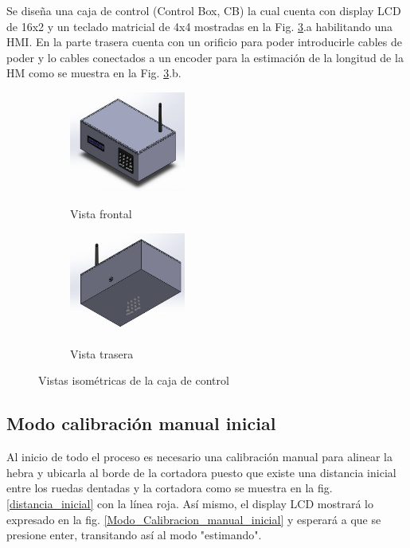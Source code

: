 \documentclass[main_conf.tex]{subfiles}
\begin{document}
Se diseña una caja de control (Control Box, CB) la cual cuenta
con display LCD de 16x2 y un teclado matricial de 4x4 mostradas
en la Fig. \ref{box_iso}.a habilitando una HMI. En la parte trasera
cuenta con un orificio para poder introducirle cables de poder y
lo cables conectados a un encoder para la estimación de la longitud
de la HM como se muestra en la Fig. \ref{box_iso}.b.

\begin{figure}[t]
  \centering
  \begin{subfigure}[b]{0.5\textwidth}
    \centering
    \includegraphics[width=1.5in]{../img/box/iso_front.png}
    \label{box_iso_front}
    \caption{Vista frontal}
  \end{subfigure}
  
  \begin{subfigure}[b]{0.5\textwidth}
    \centering
    \includegraphics[width=1.5in]{../img/box/iso_back.png}
    \label{box_iso_back}
    \caption{Vista trasera}
  \end{subfigure}

  \caption{Vistas isométricas de la caja de control}
  \label{box_iso}
\end{figure}


\subsection{Modo calibración manual inicial}
Al inicio de todo el proceso es necesario una calibración manual para
alinear la hebra y ubicarla al borde de la cortadora puesto que existe
una distancia inicial entre los ruedas dentadas y la cortadora como se
muestra en la fig. \ref{distancia_inicial} con la línea roja.
Así mismo, el display LCD mostrará lo expresado en la fig.
\ref{Modo_Calibracion_manual_inicial} y esperará a que se presione
enter, transitando así al modo "estimando".
\end{document}
